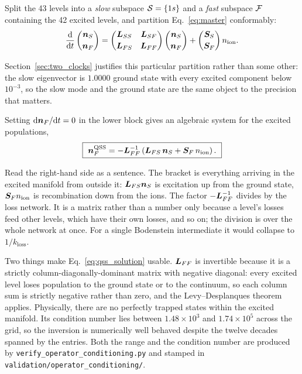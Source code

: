 Split the 43 levels into a \emph{slow} subspace $\mathcal{S} = \{1s\}$ and a
\emph{fast} subspace $\mathcal{F}$ containing the 42 excited levels, and partition
Eq.~\eqref{eq:master} conformably:
\begin{equation}
  \frac{\mathrm{d}}{\mathrm{d}t}
  \begin{pmatrix}\bm{n}_{S}\\[2pt]\bm{n}_{F}\end{pmatrix}
  =
  \begin{pmatrix}
    \bm{L}_{SS} & \bm{L}_{SF}\\[2pt]
    \bm{L}_{FS} & \bm{L}_{FF}
  \end{pmatrix}
  \begin{pmatrix}\bm{n}_{S}\\[2pt]\bm{n}_{F}\end{pmatrix}
  +
  \begin{pmatrix}\bm{S}_S\\[2pt]\bm{S}_F\end{pmatrix}n_{\mathrm{ion}} .
  \label{eq:partitioned}
\end{equation}

Section~\ref{sec:two_clocks} justifies this particular partition rather than
some other: the slow eigenvector is $1.0000$ ground state with every excited
component below $10^{-3}$, so the slow mode and the ground state are the same
object to the precision that matters.

Setting $\mathrm{d}\bm{n}_{F}/\mathrm{d}t = 0$ in the lower block gives an algebraic
system for the excited populations,
\begin{equation}
  \boxed{\ \bm{n}_{F}^{\mathrm{QSS}}
  = -\bm{L}_{FF}^{-1}\left(\bm{L}_{FS}\,\bm{n}_{S} + \bm{S}_F\,n_{\mathrm{ion}}\right).\ }
  \label{eq:qss_solution}
\end{equation}

Read the right-hand side as a sentence. The bracket is everything arriving in
the excited manifold from outside it: $\bm{L}_{FS}\bm{n}_{S}$ is excitation up from the
ground state, $\bm{S}_Fn_{\mathrm{ion}}$ is recombination down from the ions. The factor
$-\bm{L}_{FF}^{-1}$ divides by the loss network. It is a matrix rather than a
number only because a level's losses feed other levels, which have their own
losses, and so on; the division is over the whole network at once. For a
single Bodenstein intermediate it would collapse to $1/k_{\mathrm{loss}}$.

Two things make Eq.~\eqref{eq:qss_solution} usable. $\bm{L}_{FF}$ is invertible
because it is a strictly column-diagonally-dominant matrix with negative
diagonal: every excited level loses population to the ground state or to the
continuum, so each column sum is strictly negative rather than zero, and the
Levy--Desplanques theorem applies. Physically, there are no perfectly trapped
states within the excited manifold. Its condition number lies between
$1.48\times10^{3}$ and $1.74\times10^{5}$ across the grid, so the inversion is
numerically well behaved despite the twelve decades spanned by the entries.
Both the range and the condition number are produced by
\texttt{verify\_operator\_conditioning.py} and stamped in
\texttt{validation/operator\_conditioning/}.

